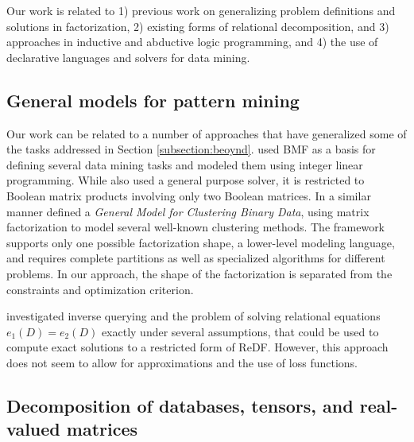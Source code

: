 \label{sec:relwork}
Our work is related to 1) previous work on generalizing problem definitions and solutions in factorization, 2) existing forms of relational decomposition, and 3) approaches in inductive and abductive logic programming, and 4) the use of declarative languages and solvers for data mining.



\subsection{General models for pattern mining} 
Our work can be related to a number of approaches that have generalized some of the tasks addressed in Section \ref{subsection:beoynd}.  
\cite{optimalBMFroles} used BMF as a basis for defining several data mining tasks and modeled them using  integer linear programming. 
While \cite{optimalBMFroles} also used a general purpose solver, it is restricted to Boolean matrix products involving only two Boolean matrices. 
In a similar manner \cite{generalClustering} defined a \textit{General Model for Clustering Binary Data}, using matrix factorization to model several well-known clustering methods.  The framework supports only one possible factorization shape, a lower-level modeling language, and requires complete partitions as well as specialized algorithms for different problems. In our approach, the shape of the factorization is separated from the constraints and optimization criterion.



\cite{solvingrelationalequations, journals/is/FanGZ12} investigated inverse querying and the problem of solving relational equations $e_1(D) = e_2(D)$ exactly under several assumptions, that could be used to compute exact solutions to a restricted form of ReDF. However, this approach does not seem to allow for approximations and the use of loss functions. 




\subsection{Decomposition of databases, tensors, and real-valued matrices} 

